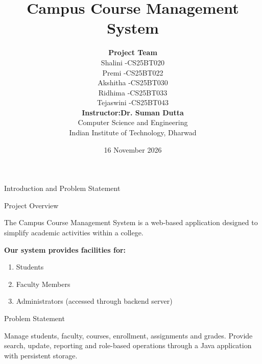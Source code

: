 \documentclass{beamer}
\title[Campus Course Management]
{\textbf{Campus Course Management System}}
\author[]{
\textbf{Project Team}\\
\vspace{0.2cm}
Shalini -CS25BT020\\
Premi -CS25BT022\\
Akshitha -CS25BT030\\
Ridhima -CS25BT033\\
Tejaswini -CS25BT043\\
\vspace{0.2cm}
\textbf{Instructor:Dr. Suman Dutta}\\
Computer Science and Engineering\\
Indian Institute of Technology, Dharwad
}
\date{16 November 2026}
\begin{document}

\begin{frame}[plain]

\titlepage

\end{frame}


\begin{frame}{Introduction and Problem Statement}

\begin{block}{Project Overview}

The Campus Course Management System is a web-based
application designed to simplify academic activities
within a college.

\end{block}

\textbf{\color{burgundy}Our system provides facilities for:}

\begin{enumerate}
    \item Students
    \item Faculty Members
    \item Administrators (accessed through backend server)
\end{enumerate}

\begin{block}{Problem Statement}

Manage students, faculty, courses, enrollment, assignments and grades. Provide search, update, reporting and role-based operations through a Java application with persistent storage.

\end{block}



\end{frame}

\end{document}
